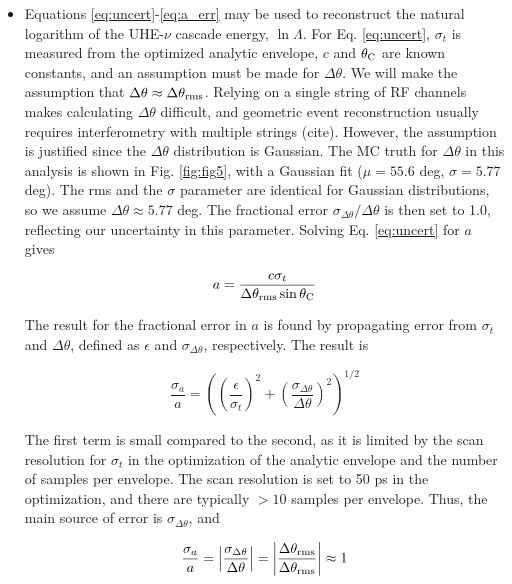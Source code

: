 \documentclass[amsmath,amssymb,aps,prd,10pt,twocolumn,showkeys]{revtex4}
\begin{document}
\begin{itemize}
\item Equations \ref{eq:uncert}-\ref{eq:a_err} may be used to reconstruct the natural logarithm of the UHE-$\nu$ cascade energy, $\ln\Lambda$.  For Eq. \ref{eq:uncert}, $\sigma_t$ is measured from the optimized analytic envelope, $c$ and $\theta_{\rm C}$ are known constants, and an assumption must be made for $\Delta\theta$.  We will make the assumption that $\Delta\theta \approx \Delta\theta_{\rm rms}$.  Relying on a single string of RF channels makes calculating $\Delta\theta$ difficult, and geometric event reconstruction usually requires interferometry with multiple strings (cite).  However, the assumption is justified since the $\Delta\theta$ distribution is Gaussian.  The MC truth for $\Delta\theta$ in this analysis is shown in Fig. \ref{fig:fig5}, with a Gaussian fit ($\mu=55.6$ deg, $\sigma=5.77$ deg).  The rms and the $\sigma$ parameter are identical for Gaussian distributions, so we assume $\Delta\theta \approx 5.77$ deg.  The fractional error $\sigma_{\Delta\theta}/\Delta\theta$ is then set to 1.0, reflecting our uncertainty in this parameter.  Solving Eq. \ref{eq:uncert} for $a$ gives

\begin{equation}
a = \frac{c\sigma_t}{\Delta\theta_{\rm rms} \sin\theta_{\rm C}}
\end{equation}

The result for the fractional error in $a$ is found by propagating error from $\sigma_t$ and $\Delta\theta$, defined as $\epsilon$ and $\sigma_{\Delta\theta}$, respectively.  The result is

\begin{equation}
\frac{\sigma_a}{a} = \left(\left(\frac{\epsilon}{\sigma_t}\right)^2 +  \left(\frac{\sigma_{\Delta\theta}}{\Delta\theta}\right)^2\right)^{1/2}
\end{equation}

The first term is small compared to the second, as it is limited by the scan resolution for $\sigma_t$ in the optimization of the analytic envelope and the number of samples per envelope.  The scan resolution is set to 50 ps in the optimization, and there are typically $>10$ samples per envelope.  Thus, the main source of error is $\sigma_{\Delta\theta}$, and

\begin{equation}
\frac{\sigma_a}{a} = \left|\frac{\sigma_{\Delta\theta}}{\Delta\theta}\right| = \left|\frac{\Delta\theta_{\rm rms}}{\Delta\theta_{\rm rms}}\right|\approx 1
\end{equation}


\end{itemize}
\end{document}
